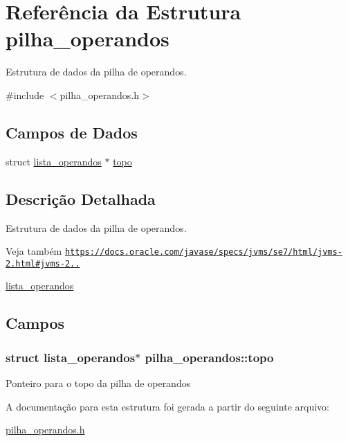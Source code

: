 \hypertarget{structpilha__operandos}{}\section{Referência da Estrutura pilha\+\_\+operandos}
\label{structpilha__operandos}


Estrutura de dados da pilha de operandos.  




{\ttfamily \#include $<$pilha\+\_\+operandos.\+h$>$}

\subsection*{Campos de Dados}
\begin{DoxyCompactItemize}
\item 
struct \hyperlink{structlista__operandos}{lista\+\_\+operandos} $\ast$ \hyperlink{structpilha__operandos_a993dd7722eed1663f266c36ecf0b8417}{topo}
\end{DoxyCompactItemize}


\subsection{Descrição Detalhada}
Estrutura de dados da pilha de operandos. 

\begin{DoxySeeAlso}{Veja também}
\href{https://docs.oracle.com/javase/specs/jvms/se7/html/jvms-2.html#jvms-2.6.2}{\tt https\+://docs.\+oracle.\+com/javase/specs/jvms/se7/html/jvms-\/2.\+html\#jvms-\/2..} 

\hyperlink{structlista__operandos}{lista\+\_\+operandos} 
\end{DoxySeeAlso}


\subsection{Campos}
\subsubsection[{\texorpdfstring{topo}{topo}}]{\setlength{\rightskip}{0pt plus 5cm}struct {\bf lista\+\_\+operandos}$\ast$ pilha\+\_\+operandos\+::topo}\hypertarget{structpilha__operandos_a993dd7722eed1663f266c36ecf0b8417}{}\label{structpilha__operandos_a993dd7722eed1663f266c36ecf0b8417}
Ponteiro para o topo da pilha de operandos 

A documentação para esta estrutura foi gerada a partir do seguinte arquivo\+:\begin{DoxyCompactItemize}
\item 
\hyperlink{pilha__operandos_8h}{pilha\+\_\+operandos.\+h}\end{DoxyCompactItemize}
